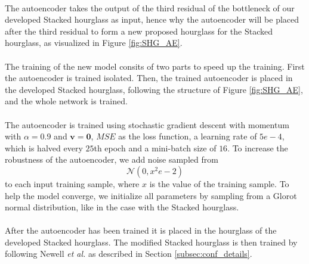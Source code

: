 \documentclass[./main.tex]{subfiles}
\begin{document}
\\
The autoencoder takes the output of the third residual of the bottleneck of our developed Stacked hourglass as input, hence why the autoencoder will be placed after the third residual to form a new proposed hourglass for the Stacked hourglass, as visualized in Figure \ref{fig:SHG_AE}.
\\
\\
The training of the new model consits of two parts to speed up the training. First the autoencoder is trained isolated. Then, the trained autoencoder is placed in the developed Stacked hourglass, following the structure of Figure \ref{fig:SHG_AE}, and the whole network is trained.
\\
\\
The autoencoder is trained using stochastic gradient descent with momentum with $\alpha = 0.9$ and $\bm{v} = \bm{0}$, $MSE$ as the loss function, a learning rate of $5e-4$, which is halved every $25$th epoch and a mini-batch size of $16$. To increase the robustness of the autoencoder, we add noise sampled from
$$\mathcal{N} \left(0, x^2e-2 \right)$$
to each input training sample, where $x$ is the value of the training sample. To help the model converge, we initialize all parameters by sampling from a Glorot normal distribution, like in the case with the Stacked hourglass.
\\
\\
After the autoencoder has been trained it is placed in the hourglass of the developed Stacked hourglass. The modified Stacked hourglass is then trained by following Newell \textit{et al.} \cite{Newell} as described in Section \ref{subsec:conf_details}.
\end{document}
